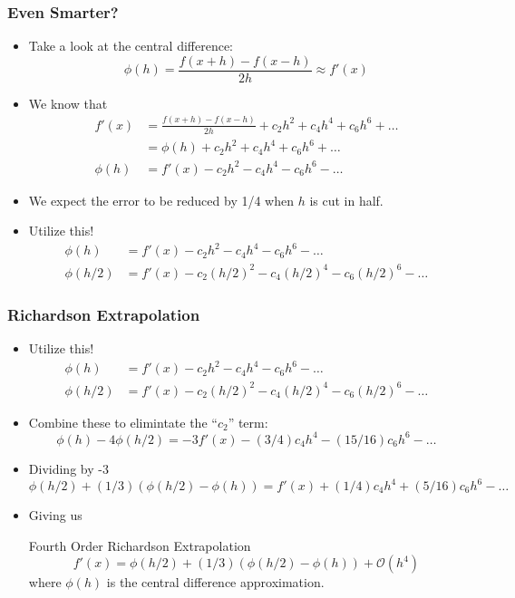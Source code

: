 \documentclass[10pt]{beamer}
\newcommand{\mO}{{\mathcal{O}}}
\begin{document}
\begin{frame}
\frametitle{Even Smarter?}
\begin{itemize}
    \item Take a look at the central difference:
    \begin{equation*}
      \phi(h) = \frac{f(x+h) - f(x-h)}{2h} \approx f'(x)
    \end{equation*}
    \item<2-> We know that
    \begin{align*}
      f'(x) & =  \frac{f(x+h) - f(x-h)}{2h} + c_2 h^2 + c_4 h^4 + c_6 h^6 + \dots\\
            & =  \phi(h) + c_2 h^2 + c_4 h^4 + c_6 h^6 + \dots\\
     \phi(h)& =  f'(x) - c_2 h^2 - c_4 h^4 - c_6 h^6 - \dots
    \end{align*}
    \item<3-> We expect the error to be reduced by 1/4 when $h$ is cut in half.
    \item<4-> Utilize this!
    \begin{align*}
     \phi(h)& =  f'(x) - c_2 h^2 - c_4 h^4 - c_6 h^6 - \dots\\
     \phi(h/2)& =  f'(x) - c_2 (h/2)^2 - c_4 (h/2)^4 - c_6 (h/2)^6 - \dots
    \end{align*}
\end{itemize} 
\end{frame}
\begin{frame}
\frametitle{Richardson Extrapolation}
\begin{itemize}
    \item Utilize this!
    \begin{align*}
     \phi(h)& =  f'(x) - c_2 h^2 - c_4 h^4 - c_6 h^6 - \dots\\
     \phi(h/2)& =  f'(x) - c_2 (h/2)^2 - c_4 (h/2)^4 - c_6 (h/2)^6 - \dots
    \end{align*}
    \item<2-> Combine these to elimintate the ``$c_2$'' term:
    \begin{equation*}
     \phi(h) - 4 \phi(h/2) =  -3 f'(x) - (3/4)c_4 h^4 - (15/16)c_6 h^6 - \dots
    \end{equation*}
    \item<3->Dividing by -3
    \begin{equation*}
     \phi(h/2) + (1/3) (\phi(h/2) - \phi(h)) =  f'(x) + (1/4)c_4 h^4 + (5/16)c_6 h^6 - \dots
    \end{equation*}
    \item<4-> Giving us 
    \begin{block}{Fourth Order Richardson Extrapolation}
    \begin{equation*}
     f'(x) = \phi(h/2) + (1/3) (\phi(h/2) - \phi(h)) + \mO(h^4)
    \end{equation*}
    where $\phi(h)$ is the central difference approximation.
    \end{block}
\end{itemize}
\end{frame}
\end{document}
